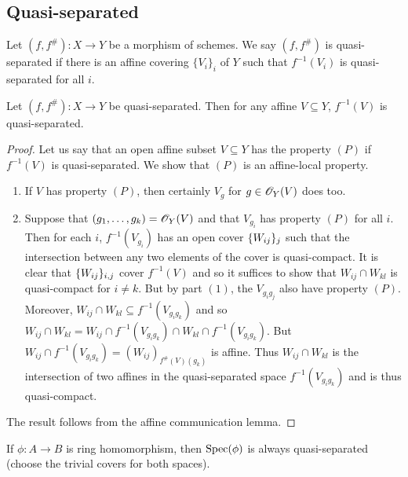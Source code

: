 \documentclass{memoir}
\begin{document}
\subsection{Quasi-separated}
\begin{definition}
    Let $(f,f^\#):X\to Y$ be a morphism of schemes.
    We say $(f,f^\#)$ is quasi-separated if there is an affine covering $\{V_i\}_i$ of $Y$ such that $f^{-1}(V_i)$ is quasi-separated for all $i$.
\end{definition}
\begin{thm}
    Let $(f,f^\#):X\to Y$ be quasi-separated.
    Then for any affine $V\subseteq Y$, $f^{-1}(V)$ is quasi-separated.
\end{thm}
\begin{proof}
    Let us say that an open affine subset $V\subseteq Y$ has the property $(P)$ if $f^{-1}(V)$ is quasi-separated.
    We show that $(P)$ is an affine-local property.
    \begin{enumerate}
        \item If $V$ has property $(P)$, then certainly $V_g$ for $g\in \mathscr{O}_Y(V)$ does too.
        \item Suppose that $(g_1,\dots,g_k) = \mathscr{O}_Y(V)$ and that $V_{g_i}$ has property $(P)$ for all $i$.
            Then for each $i$, $f^{-1}(V_{g_i})$ has an open cover $\lbrace W_{ij}\rbrace_j$ such that the intersection between any two elements of the cover is quasi-compact.
            It is clear that $\lbrace W_{ij}\rbrace_{i,j}$ cover $f^{-1}(V)$ and so it suffices to show that $W_{ij}\cap W_{kl}$ is quasi-compact for $i\ne k$.
            But by part $(1)$, the $V_{g_ig_j}$ also have property $(P)$.
            Moreover, $W_{ij}\cap W_{kl}\subseteq f^{-1}(V_{g_ig_k})$ and so $W_{ij}\cap W_{kl} = W_{ij}\cap f^{-1}(V_{g_ig_k}) \cap W_{kl}\cap f^{-1}(V_{g_ig_k})$.
            But $W_{ij}\cap f^{-1}(V_{g_ig_k}) = (W_{ij})_{f^\#(V)(g_k)}$ is affine.
            Thus $W_{ij}\cap W_{kl}$ is the intersection of two affines in the quasi-separated space $f^{-1}(V_{g_ig_k})$ and is thus quasi-compact.
    \end{enumerate}
    The result follows from the affine communication lemma.
\end{proof}
\begin{remark}
    If $\phi:A\to B$ is ring homomorphism, then $\operatorname{Spec}(\phi)$ is always quasi-separated (choose the trivial covers for both spaces).
\end{remark}
\end{document}
